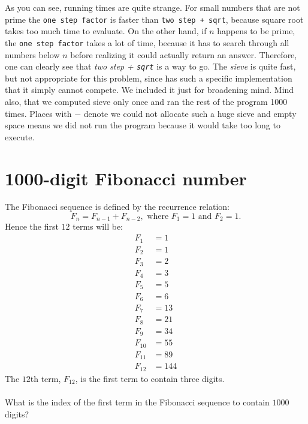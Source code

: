 \documentclass{book}
\newenvironment{task}
  {\begin{mdframed}[backgroundcolor=lightgray]}
  {\end{mdframed}}
\begin{document}
As you can see, running times are quite strange. For small numbers that are not prime the \texttt{one step \texttt{factor}} is faster than \texttt{two step + \texttt{sqrt}}, because square root takes too much time to evaluate. On the other hand, if $n$ happens to be prime, the \texttt{one step \texttt{factor}} takes a lot of time, because it has to search through all numbers below $n$ before realizing it could actually return an answer. Therefore, one can clearly see that \textit{two step + \texttt{sqrt}} is a way to go. The \textit{sieve} is quite fast, but not appropriate for this problem, since has such a specific implementation that it simply cannot compete. We included it just for broadening mind. Mind also, that we computed sieve only once and ran the rest of the program 1000 times. Places with $-$ denote we could not allocate such a huge sieve and empty space means we did not run the program because it would take too long to execute.





\setcounter{section}{24}
\section{1000-digit Fibonacci number}

\begin{task}
The Fibonacci sequence is defined by the recurrence relation:
\[F_n = F_{n-1} + F_{n-2},\textrm{ where $F_1 = 1$ and $F_2 = 1$}.\]
Hence the first $12$ terms will be:
\begin{align*}
F_1 &= 1\\
F_2 &= 1\\
F_3 &= 2\\
F_4 &= 3\\
F_5 &= 5\\
F_6 &= 6\\
F_7 &= 13\\
F_8 &= 21\\
F_9 &= 34\\
F_{10} &= 55\\
F_{11} &= 89\\
F_{12} &= 144
\end{align*}
The $12$th term, $F_{12}$, is the first term to contain three digits.\\
\\
What is the index of the first term in the Fibonacci sequence to contain $1000$ digits?
\end{task}
\end{document}
